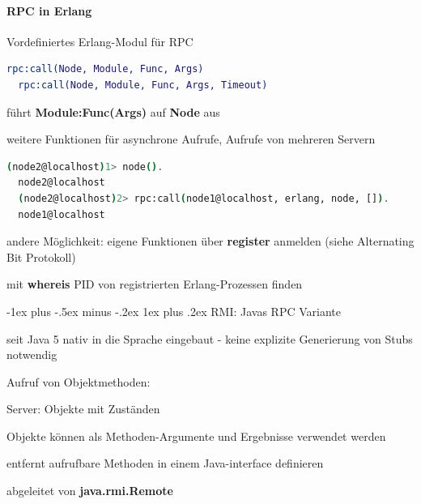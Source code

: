 \documentclass[10pt]{article}
\makeatletter
\renewcommand{\subsubsection}{\@startsection{subsubsection}{3}{0mm}%
                                {-1ex plus -.5ex minus -.2ex}%
                                {1ex plus .2ex}%
                                {\normalfont\small\bfseries}}
\makeatother
\begin{document}
\paragraph{RPC in Erlang}

\begin{itemize*}
  \item Vordefiniertes Erlang-Modul für RPC
  \begin{lstlisting}[language=erlang]
  rpc:call(Node, Module, Func, Args)
  rpc:call(Node, Module, Func, Args, Timeout)
  \end{lstlisting}
  \item führt \textbf{Module:Func(Args)} auf \textbf{Node} aus
  \begin{itemize*}
    \item weitere Funktionen für asynchrone Aufrufe, Aufrufe von mehreren Servern
  \end{itemize*}
  \begin{lstlisting}[language=bash]
  (node2@localhost)1> node().
  node2@localhost
  (node2@localhost)2> rpc:call(node1@localhost, erlang, node, []).
  node1@localhost
  \end{lstlisting}
  \item andere Möglichkeit: eigene Funktionen über \textbf{register} anmelden (siehe Alternating Bit Protokoll)
  \item mit \textbf{whereis} PID von registrierten Erlang-Prozessen finden
\end{itemize*}

\subsubsection{RMI: Javas RPC Variante}
\begin{itemize*}
  \item seit Java 5 nativ in die Sprache eingebaut - keine explizite Generierung von Stubs notwendig
  \item Aufruf von Objektmethoden:
  \begin{itemize*}
    \item Server: Objekte mit Zuständen
    \item Objekte können als Methoden-Argumente und Ergebnisse verwendet werden
  \end{itemize*}
  \item entfernt aufrufbare Methoden in einem Java-interface definieren
  \begin{itemize*}
    \item abgeleitet von \textbf{java.rmi.Remote}
  \end{itemize*}
\end{itemize*}
\end{document}
